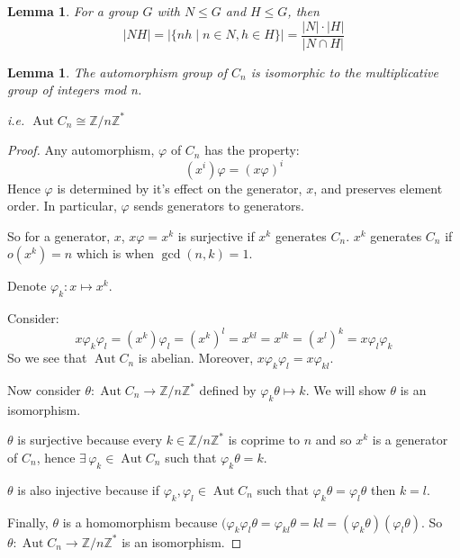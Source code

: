 \documentclass[a4paper, oneside, 12pt, final]{article}
\newtheorem{lemma}[theorem]{Lemma}
\theoremstyle{definition}
\DeclareMathOperator{\Aut}{Aut}
\newcommand{\Z}{\mathbb{Z}}
\newcommand{\Zn}[1]{\Z/#1\Z}
\begin{document}
\begin{lemma}
\label{lem:setprodorder}
    For a group \(G\) with \(N \leqslant G\) and \(H \leqslant G\), then
    \[|NH| = |\{nh \mid n \in N, h \in H\}| = \frac{|N| \cdot |H|}{|N \cap H|}\]
\end{lemma}

\begin{lemma}
\label{lem:aut}
    The automorphism group of \(C_n\) is isomorphic to the multiplicative group of integers mod n.

    i.e. \(\Aut{C_n} \cong \Zn{n}^*\)
\end{lemma}

\begin{proof}
    Any automorphism, \(\varphi\) of \(C_n\) has the property:
    \[(x^i)\varphi = (x\varphi)^i\]
    Hence \(\varphi\) is determined by it's effect on the generator, \(x\), and
    preserves element order.
    In particular, \(\varphi\) sends generators to generators.

    So for a generator, \(x\), \(x\varphi = x^k\) is surjective if \(x^k\)
    generates \(C_n\).
    \(x^k\) generates \(C_n\) if \(o(x^k) = n\) which is when \(\gcd{(n, k)} =
    1\).

    Denote \(\varphi_k:x \mapsto x^k\).

    Consider:
    \[x\varphi_k\varphi_l = (x^k)\varphi_l = (x^k)^l = x^{kl} = x^{lk} = (x^l)^k = x\varphi_l\varphi_k\]
    So we see that \(\Aut{C_n}\) is abelian.
    Moreover, \(x\varphi_k\varphi_l = x\varphi_{kl}\).

    Now consider \(\theta:\Aut{C_n} \to \Zn{n}^*\) defined by \(\varphi_k\theta
    \mapsto k\).
    We will show \(\theta\) is an isomorphism.

    \(\theta\) is surjective because every \(k \in \Zn{n}^*\) is coprime to
    \(n\) and so \(x^k\) is a generator of \(C_n\), hence \(\exists\,\varphi_k
    \in \Aut{C_n}\) such that \(\varphi_k\theta = k\).

    \(\theta\) is also injective because if \(\varphi_k, \varphi_l \in
    \Aut{C_n}\) such that \(\varphi_k\theta = \varphi_l\theta\) then \(k = l\).

    Finally, \(\theta\) is a homomorphism because \((\varphi_k\varphi_l\theta =
    \varphi_{kl}\theta = kl = (\varphi_k\theta)(\varphi_l\theta)\).
    So \(\theta:\Aut{C_n} \to \Zn{n}^*\) is an isomorphism.

\end{proof}

\end{document}
